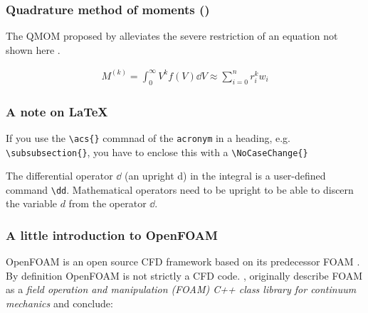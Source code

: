 \subsubsection{Quadrature method of moments  ()}

The \acs{QMOM} proposed by \citet{mcGraw1997} alleviates the severe restriction of 
an equation not shown here \cite{mcGraw1997}. 

\begin{gather}
	M^{(k)} = \int_0^\infty V^k f(V) \dd V \approx \sum_{i=0}^n r_i^k w_i \label{eq:qmomAssumption}
\end{gather}


%
%


\subsubsection*{A note on \LaTeX{}}

If you use the \verb+\acs{}+ commnad of the \verb+acronym+ in a heading, e.g. \verb+\subsubsection{}+, you 
have to enclose this with a \verb+\NoCaseChange{}+

The differential operator $\dd$ (an upright d) in the integral is a user-defined command \verb+\dd+. 
Mathematical operators need to be upright to be able to discern the variable $d$ from the operator $\dd$.





\subsubsection{A little introduction to OpenFOAM}

OpenFOAM is an open source CFD framework based on its predecessor \acs{FOAM} \cite{weller1998}. By 
definition OpenFOAM is not strictly a CFD code. \citet{weller1998},
\citet{weller1992} originally describe \acs{FOAM} as a \emph{field operation and
manipulation (\acs{FOAM}) C++ class library for continuum mechanics} and conclude:

